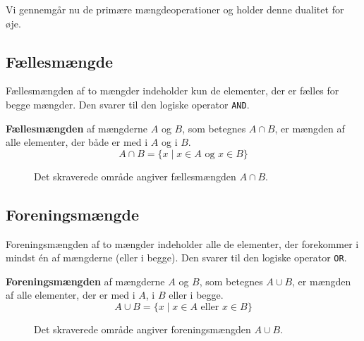 Vi gennemgår nu de primære mængdeoperationer og holder denne dualitet for øje.

\subsection*{Fællesmængde}
Fællesmængden af to mængder indeholder kun de elementer, der er fælles for begge mængder. Den svarer til den logiske operator \texttt{AND}.

\begin{definition}[Fællesmængde]
    \textbf{Fællesmængden} af mængderne $A$ og $B$, som betegnes $A \cap B$, er mængden af alle elementer, der både er med i $A$ og i $B$.
    \[ A \cap B = \{ x \mid x \in A \text{ og } x \in B \} \]
\end{definition}

\begin{figure}[htbp]
    \centering
    \caption{Det skraverede område angiver fællesmængden $A \cap B$.}
    \label{fig:intersection_custom}
\end{figure}

\subsection*{Foreningsmængde}
Foreningsmængden af to mængder indeholder alle de elementer, der forekommer i mindst én af mængderne (eller i begge). Den svarer til den logiske operator \texttt{OR}.

\begin{definition}[Foreningsmængde]
    \textbf{Foreningsmængden} af mængderne $A$ og $B$, som betegnes $A \cup B$, er mængden af alle elementer, der er med i $A$, i $B$ eller i begge.
    \[ A \cup B = \{ x \mid x \in A \text{ eller } x \in B \} \]
\end{definition}

\begin{figure}[htbp]
    \centering
    \caption{Det skraverede område angiver foreningsmængden $A \cup B$.}
    \label{fig:union_custom}
\end{figure}

